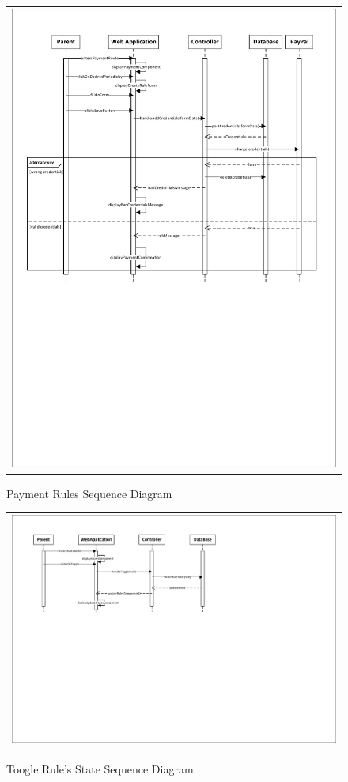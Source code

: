 \documentclass{sprawozdanie-agh}
\begin{document}
			\begin{figure}[H] 
				\centering
				\begin{tabular}{c}
					\includegraphics[width=.85\textwidth]{paymentSequenceDiagram}
				\end{tabular} 
				\caption{Payment Rules Sequence Diagram}
			\end{figure}

			\begin{figure}[H] 
				\centering
				\begin{tabular}{c}
					\includegraphics[width=.85\textwidth]{toggleSequence}
				\end{tabular} 
				\caption{Toogle Rule's State Sequence Diagram}
			\end{figure}
		
\end{document}
